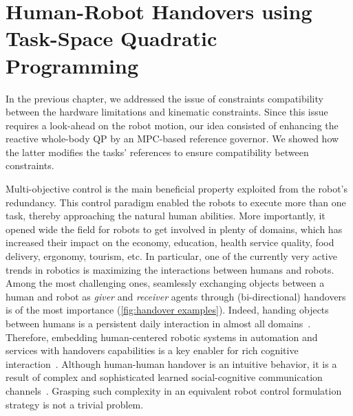 
\chapter{Human-Robot Handovers using Task-Space Quadratic Programming}\label{chap:handover qp}


In the previous chapter, we addressed the issue of constraints compatibility between the hardware limitations and kinematic constraints. Since this issue requires a look-ahead on the robot motion, our idea consisted of enhancing the reactive whole-body QP by an MPC-based reference governor. We showed how the latter modifies the tasks' references to ensure compatibility between constraints.


Multi-objective control is the main beneficial property exploited from the robot's redundancy. This control paradigm enabled the robots to execute more than one task, thereby approaching the natural human abilities. More importantly,  it opened wide the field for robots to get involved in plenty of domains, which has increased their impact on the economy, education, health service quality, food delivery, ergonomy, tourism, etc. In particular, one of the currently very active trends in robotics is maximizing the interactions between humans and robots. Among the most challenging ones, seamlessly exchanging objects between a human and robot as \emph{giver} and \emph{receiver} agents through (bi-directional) handovers is of the most importance (\cref{fig:handover examples}). Indeed, handing objects between humans is a persistent daily interaction in almost all domains~\cite{ortenzi2021tro}. Therefore, embedding human-centered robotic systems in automation and services with handovers capabilities is a key enabler for rich cognitive interaction~\cite{ajoudani2018autonomousRobots,billard2019science}. Although human-human handover is an intuitive behavior, it is a result of complex and sophisticated learned social-cognitive communication channels~\cite{strabala2013jhrisc}. Grasping such complexity in an equivalent robot control formulation strategy is not a trivial problem.

